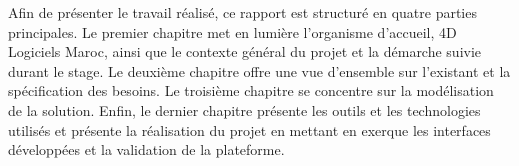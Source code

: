 Afin de présenter le travail réalisé, ce rapport est 
structuré en quatre parties principales. Le premier 
chapitre met en lumière l’organisme d’accueil, 4D Logiciels 
Maroc, ainsi que le contexte général du projet et 
la démarche suivie durant le stage. Le deuxième chapitre 
offre une vue d'ensemble sur l'existant et la spécification 
des besoins. Le troisième chapitre se concentre sur la 
modélisation de la solution. Enfin, le dernier chapitre 
présente les outils et les technologies utilisés et présente la réalisation 
du projet en mettant en exerque les interfaces développées et la validation 
de la plateforme.



